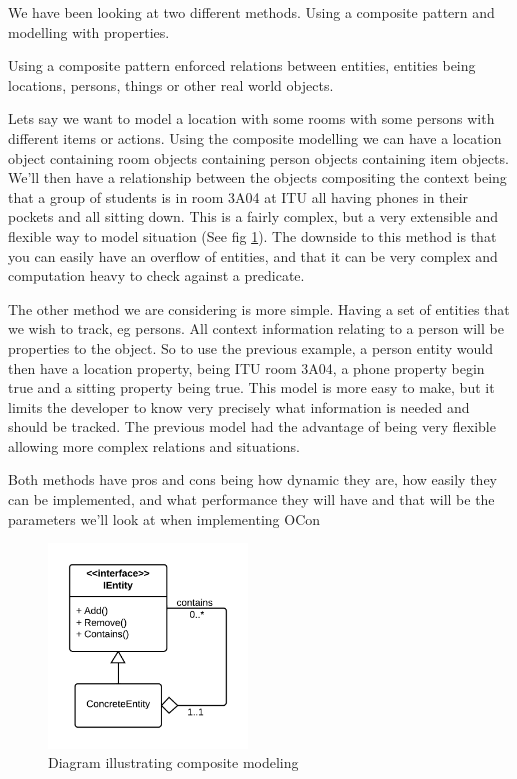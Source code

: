 \documentclass[]{report}
\begin{document}
We have been looking at two different methods. Using a composite pattern and modelling with properties.

Using a composite pattern enforced relations between entities, entities being locations, persons, things or other real world objects.

Lets say we want to model a location with some rooms with some persons with different items or actions. Using the composite modelling we can have a location object containing room objects containing person objects containing item objects. We'll then have a relationship between the objects compositing the context being that a group of students is in room 3A04 at ITU all having phones in their pockets and all sitting down. This is a fairly complex, but a very extensible and flexible way to model situation (See fig \ref{fig:composite}). The downside to this method is that you can easily have an overflow of entities, and that it can be very complex and computation heavy to check against a predicate.

The other method we are considering is more simple. Having a set of entities that we wish to track, eg persons. All context information relating to a person will be properties to the object. So to use the previous example, a person entity would then have a location property, being ITU room 3A04, a phone property begin true and a sitting property being true. This model is more easy to make, but it limits the developer to know very precisely what information is needed and should be tracked. The previous model had the advantage of being very flexible allowing more complex relations and situations. 

Both methods have pros and cons being how dynamic they are, how easily they can be implemented, and what performance they will have and that will be the parameters we'll look at when implementing OCon 

\begin{figure}
\centering
\includegraphics[width=200px]{composite.png}
\caption{Diagram illustrating composite modeling}
\label{fig:composite}
\end{figure}
\end{document}
